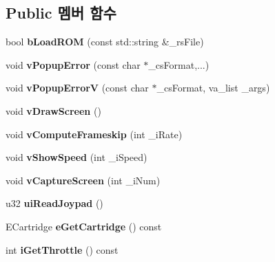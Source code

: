 \subsection*{Public 멤버 함수}
\begin{DoxyCompactItemize}
\item 
\mbox{\label{class_v_b_a_1_1_window_a69ddb41bd29d9f0db04175671ff2e2f4}} 
bool {\bfseries b\+Load\+R\+OM} (const std\+::string \&\+\_\+rs\+File)
\item 
\mbox{\label{class_v_b_a_1_1_window_afde18894816458e195f561b03ee2898c}} 
void {\bfseries v\+Popup\+Error} (const char $\ast$\+\_\+cs\+Format,...)
\item 
\mbox{\label{class_v_b_a_1_1_window_a1f89a108839ea022393c56782dde0f60}} 
void {\bfseries v\+Popup\+ErrorV} (const char $\ast$\+\_\+cs\+Format, va\+\_\+list \+\_\+args)
\item 
\mbox{\label{class_v_b_a_1_1_window_af82e47600303a15b2aa4fdffb90df394}} 
void {\bfseries v\+Draw\+Screen} ()
\item 
\mbox{\label{class_v_b_a_1_1_window_abcfa3555126b7804609a8438ece3266e}} 
void {\bfseries v\+Compute\+Frameskip} (int \+\_\+i\+Rate)
\item 
\mbox{\label{class_v_b_a_1_1_window_acf7f6aac9ae790353c5c61e7afa3515e}} 
void {\bfseries v\+Show\+Speed} (int \+\_\+i\+Speed)
\item 
\mbox{\label{class_v_b_a_1_1_window_a68341ae65a5ec41c6e6269d6f579aa08}} 
void {\bfseries v\+Capture\+Screen} (int \+\_\+i\+Num)
\item 
\mbox{\label{class_v_b_a_1_1_window_ad5768e6fccecbcc761de003ae915684b}} 
u32 {\bfseries ui\+Read\+Joypad} ()
\item 
\mbox{\label{class_v_b_a_1_1_window_aed86700e3c983d6858c24e48eea48710}} 
E\+Cartridge {\bfseries e\+Get\+Cartridge} () const
\item 
\mbox{\label{class_v_b_a_1_1_window_a1f6599f43eda534897aa9aea53a840a0}} 
int {\bfseries i\+Get\+Throttle} () const
\end{DoxyCompactItemize}
